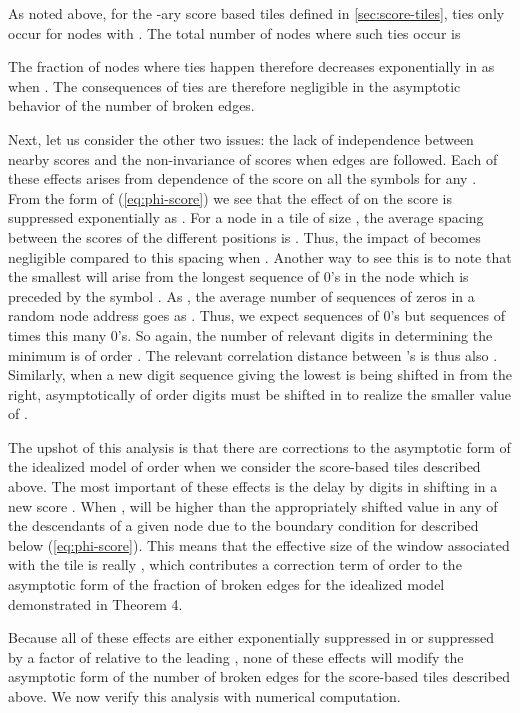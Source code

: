 \documentclass[12pt]{article}
\begin{document}
As noted above,  for the -ary score based tiles defined in 
\ref{sec:score-tiles},
ties
only occur for nodes with .  The total number of nodes where such ties occur is

The fraction of nodes where ties happen therefore decreases
exponentially in  as  when .
The consequences of ties are therefore negligible in the asymptotic
behavior of the number of broken edges.

Next, let us consider the other two issues: the lack of independence
between nearby scores and the non-invariance of scores when edges are
followed.  Each of these effects arises from dependence of the score
 on all the symbols  for any .  From the
form of (\ref{eq:phi-score}) we see that the effect of  on
the score  is suppressed exponentially as .  For a node
in a tile of size , the average spacing between the scores of the
 different positions  is .  Thus, the impact of 
becomes negligible compared to this spacing when .
Another way to see this is to note that the smallest  will arise
from the longest sequence of 0's in the node which is preceded by the
symbol .  As , the average number of
sequences of  zeros in a random node address goes as .
Thus, we expect  sequences of  0's but 
 sequences of  times this many 0's.  So again, the
number of relevant digits in determining the minimum  is of order
.  The relevant correlation distance between 's is
thus also .  Similarly, when a new digit sequence giving the
lowest  is being shifted in from the right, asymptotically of
order  digits must be shifted in to realize the smaller
value of .

The upshot of this analysis is that there are corrections to the
asymptotic form of the idealized model of order  when we
consider the score-based tiles described above.  The most important of
these effects is the delay by  digits in shifting in a new
score .  When ,  will be higher than
the appropriately shifted value in any of the descendants of a given
node due to the boundary condition  for  described
below (\ref{eq:phi-score}).  This means that the effective size of the
window associated with the tile is really ,
which contributes a correction term of order  to the
asymptotic form of the fraction of broken edges  for the
idealized model demonstrated in Theorem 4.

Because all of these effects are either exponentially suppressed in
 or suppressed by a factor of  relative to the
leading , none of these effects will modify the asymptotic form
of the number of broken edges for the score-based tiles described
above.  We now verify this analysis with numerical computation.
\end{document}
